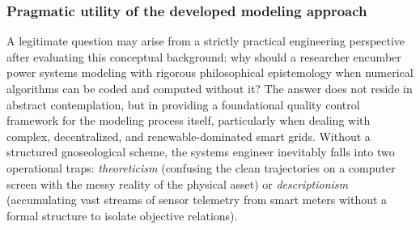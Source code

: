 \documentclass[11pt, a4paper]{article}
\begin{document}
\subsubsection{Pragmatic utility of the developed modeling approach} \label{sec:pragmatic_utility}

A legitimate question may arise from a strictly practical engineering perspective after evaluating this conceptual background: why should a researcher encumber power systems modeling with rigorous philosophical epistemology when numerical algorithms can be coded and computed without it? The answer does not reside in abstract contemplation, but in providing a foundational quality control framework for the modeling process itself, particularly when dealing with complex, decentralized, and renewable-dominated smart grids. Without a structured gnoseological scheme, the systems engineer inevitably falls into two operational traps: \textit{theoreticism} (confusing the clean trajectories on a computer screen with the messy reality of the physical asset) or \textit{descriptionism} (accumulating vast streams of sensor telemetry from smart meters without a formal structure to isolate objective relations).
\end{document}
